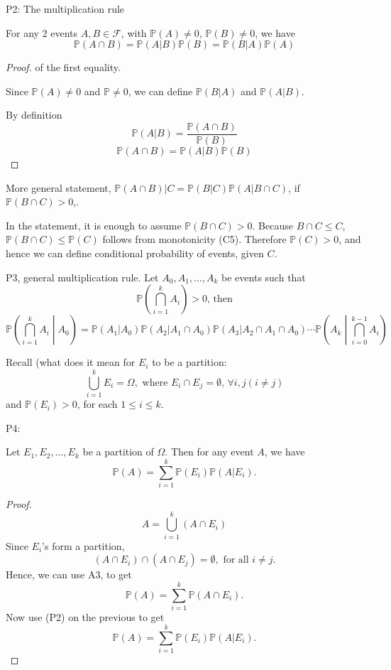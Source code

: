 \documentclass[10pt, a4paper]{article}
\begin{document}
P2: The multiplication rule

For any $2$ events $A, B \in \mathcal{F}$, with $\mathbb{P}(A) \neq 0$, $\mathbb{P}(B) \neq 0$, we have
\[
\mathbb{P}(A \cap B) = \mathbb{P}(A | B)\mathbb{P}(B) = \mathbb{P}(B | A)\mathbb{P}(A)
\]
\begin{proof}
    of the first equality.
    
    Since $\mathbb{P}(A) \neq 0$ and $\mathbb{P} \neq 0$, we can define $\mathbb{P}(B | A)$ and $\mathbb{P}(A | B)$.

    By definition
    \[
    \mathbb{P}(A | B) = \frac{\mathbb{P}(A \cap B)}{\mathbb{P}(B)}
    \]
    \[
    \mathbb{P}(A \cap B) = \mathbb{P}(A | B)\mathbb{P}(B)
    \]
\end{proof}

More general statement, $\mathbb{P}(A \cap B) | C = \mathbb{P}(B | C)\mathbb{P}(A | B \cap C)$, if $\mathbb{P}(B \cap C) > 0$,.

In the statement, it is enough to assume $\mathbb{P}(B \cap C) > 0$. Because $B \cap C \leq C$, $\mathbb{P}(B \cap C) \leq \mathbb{P}(C)$ follows from monotonicity (C5). Therefore $\mathbb{P}(C) > 0$, and hence we can define conditional probability of events, given $C$.

P3, general multiplication rule. Let $A_0, A_1, \dotsc, A_k$ be events such that
\[
\mathbb{P}\left(\bigcap_{i = 1}^{k}A_i\right) > 0\text{, then}
\]
\[
\mathbb{P}\left(\bigcap_{i = 1}^{k}A_i \middle| A_0\right) = \mathbb{P}(A_1 | A_0)\mathbb{P}(A_2 | A_1 \cap A_0)\mathbb{P}(A_3 | A_2 \cap A_1 \cap A_0) \dotsi \mathbb{P}\left(A_k \middle| \bigcap_{i = 0}^{k - 1}A_i\right)
\]

Recall (what does it mean for $E_i$ to be a partition:
\[
\bigcup_{i = 1}^{k}E_i = \Omega,\text{ where } E_i \cap E_j = \emptyset,\,\forall i, j (i \neq j)
\]
and $\mathbb{P}(E_i) > 0$, for each $1 \leq i \leq k$.

P4:
\begin{theorem}
    Let $E_1, E_2, \dotsc, E_k$ be a partition of $\Omega$. Then for any event $A$, we have
    \[
    \mathbb{P}(A) = \sum_{i = 1}^{k}\mathbb{P}(E_i)\mathbb{P}(A | E_i).
    \]
    \begin{proof}
        \[
        A = \bigcup_{i = 1}^{k}(A \cap E_i)
        \]
        Since $E_i$'s form a partition,
        \[
        (A \cap E_i) \cap (A \cap E_j) = \emptyset, \text{ for all } i \neq j.
        \]
        Hence, we can use A3, to get
        \[
        \mathbb{P}(A) = \sum_{i = 1}^{k}\mathbb{P}(A \cap E_i).
        \]
        Now use (P2) on the previous to get
        \[
        \mathbb{P}(A) = \sum_{i = 1}^{k}\mathbb{P}(E_i)\mathbb{P}(A | E_i).
        \]
    \end{proof}
\end{theorem}
\end{document}
